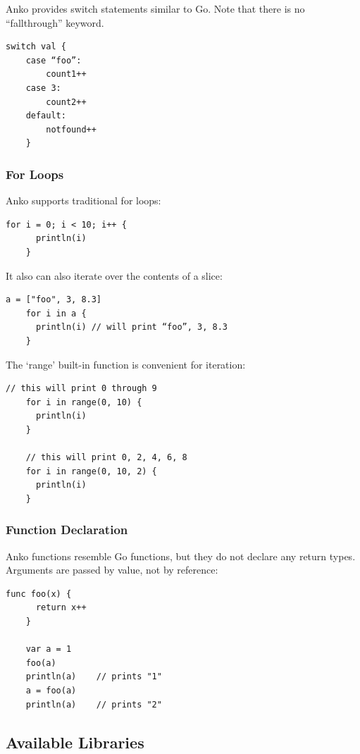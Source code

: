Anko provides switch statements similar to Go. Note that there is no
``fallthrough'' keyword.

\begin{Verbatim}[breaklines=true]
    switch val {
    case “foo”:
        count1++
    case 3:
        count2++
    default:
        notfound++
    }
\end{Verbatim}


\subsubsection{For Loops}

Anko supports traditional for loops:

\begin{Verbatim}[breaklines=true]
    for i = 0; i < 10; i++ {
      println(i)
    }
\end{Verbatim}

It also can also iterate over the contents of a slice:

\begin{Verbatim}[breaklines=true]
    a = ["foo", 3, 8.3]
    for i in a {
      println(i) // will print “foo”, 3, 8.3
    }
\end{Verbatim}

The `range' built-in function is convenient for iteration:

\begin{Verbatim}[breaklines=true]
    // this will print 0 through 9
    for i in range(0, 10) {
      println(i)
    }
    
    // this will print 0, 2, 4, 6, 8
    for i in range(0, 10, 2) {
      println(i)
    }
\end{Verbatim}

\subsubsection{Function Declaration}

Anko functions resemble Go functions, but they do not declare any
return types. Arguments are passed by value, not by reference:

\begin{Verbatim}[breaklines=true]
    func foo(x) {
      return x++
    }
    
    var a = 1
    foo(a)
    println(a)    // prints "1"
    a = foo(a)
    println(a)    // prints "2"
\end{Verbatim}

\subsection{Available Libraries}

